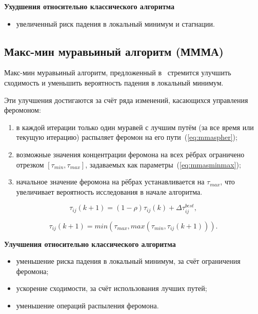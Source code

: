\textbf{Ухудшения относительно классического алгоритма}

\begin{itemize}
	\item увеличенный риск падения в локальный минимум и стагнации.
\end{itemize} 

\subsection*{Макс-мин муравьиный алгоритм (МММА)}

Макс-мин муравьиный алгоритм, предложенный в~\cite{mmas} стремится улучшить сходимость и уменьшить вероятность падения в локальный минимум.

Эти улучшения достигаются за счёт ряда изменений, касающихся управления феромоном:
\begin{enumerate}
	\item в каждой итерации только один муравей с лучшим путём (за все время или текущую итерацию) распыляет феромон на его пути~(\ref{eq:mmaspher});
	\item возможные значения концентрации феромона на всех рёбрах ограничено отрезком $[\tau_{min}, \tau_{max}]$, задаваемых как параметры~(\ref{eq:mmasminmax});
	\item начальное значение феромона на рёбрах устанавливается на $\tau_{max}$, что увеличивает вероятность исследования в начале алгоритма.
\end{enumerate}

\begin{equation}
	\tau_{ij}(k+1)=(1 - \rho)\tau_{ij}(k) + \Delta\tau_{ij}^{best},
	\label{eq:mmaspher}
\end{equation}

\begin{equation}
	\tau_{ij}(k+1) = min(\tau_{max}, max(\tau_{min}, \tau_{ij}(k+1))).
	\label{eq:mmasminmax}
\end{equation}

\textbf{Улучшения относительно классического алгоритма}

\begin{itemize}
	\item уменьшение риска падения в локальный минимум, за счёт ограничения феромона;
	\item ускорение сходимости, за счёт использования лучших путей;
	\item уменьшение операций распыления феромона.
\end{itemize}

